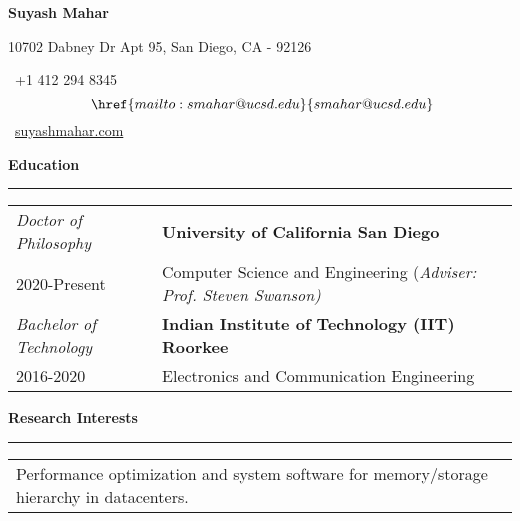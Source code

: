 \documentclass{article}
\makeatletter
\newcommand*{\bigcdot}{}%
\DeclareRobustCommand*{\bigcdot}{%
  \mathbin{\mathpalette\bigcdot@{}}%
}
\newcommand*{\bigcdot@scalefactor}{.5}
\newcommand*{\bigcdot@widthfactor}{1.15}
\newcommand*{\bigcdot@}[2]{%
  \sbox0{$#1\vcenter{}$}%
  \sbox2{$#1\cdot\m@th$}%
  \hbox to \bigcdot@widthfactor\wd2{%
    \hfil
    \raise\ht0\hbox{%
      \scalebox{\bigcdot@scalefactor}{%
        \lower\ht0\hbox{$#1\bullet\m@th$}%
      }%
    }%
    \hfil
  }%
}
\newcommand{\sectiontitle}[1]{
  \textbf{\Large{\sffamily #1}}
  \begin{flushright}
      \vspace{-0.48cm} 
      \rule{0.975\textwidth}{1.1pt}
  \end{flushright}
  \vspace{-0.1cm} 
}
\makeatother
\begin{document}
\thispagestyle{firstpage}

\begin{singlespace}
    \begin{center}
        \textbf{\Huge \sffamily Suyash Mahar}
    \end{center}

    \begin{center}
        \vspace{-0.1cm}
        10702 Dabney Dr Apt 95, San Diego, CA - 92126
    \end{center}

    \begin{center}
        \vspace{-0.2cm}
        \faPhone\ +1 412 294 8345 $\bigcdot$
        \faEnvelope\ \href{mailto:smahar@ucsd.edu}
        {smahar@ucsd.edu} $\bigcdot$ \faGlobe\ \href{https://suyashmahar.com}{suyashmahar.com} %
    \end{center}
\end{singlespace}

\sectiontitle{Education}

\begin{tabular}{p{} p{}}
  \hfill \textit{Doctor of Philosophy}           & \large\textbf{University of California San Diego} \\
  \hfill \footnotesize 2020-Present              & Computer Science and Engineering (\textit{Adviser: Prof. Steven Swanson)}\\[2mm]
  \hfill \textit{Bachelor of Technology}         & \large \textbf{Indian Institute of Technology (IIT) Roorkee} \\
  \hfill \footnotesize 2016-2020                 & Electronics and Communication Engineering\\
\end{tabular} 

\vspace{2mm}

\sectiontitle{Research Interests}

\begin{tabular}{p{} p{}} 
  Performance optimization and system software for memory/storage hierarchy in datacenters.&\\
\end{tabular}
\vspace{4mm}
\end{document}
